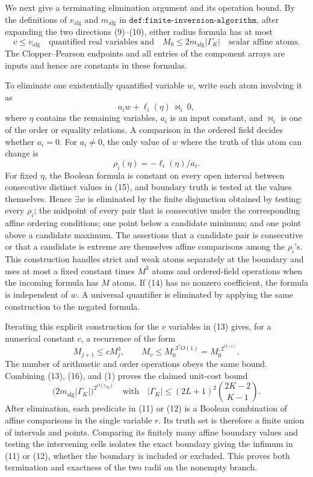 We next give a terminating elimination argument and its operation bound.  By the definitions of \(v_{\mathrm{alg}}\) and \(m_{\mathrm{alg}}\) in \(\texttt{def:finite-inversion-algorithm}\), after expanding the two directions (9)--(10), either radius formula has at most
\[
 v\leq v_{\mathrm{alg}}
 \quad\text{quantified real variables and}\quad
 M_0\leq 2m_{\mathrm{alg}}|\Gamma_K|
 \quad\text{scalar affine atoms}.
 \tag{13}
\]
The Clopper--Pearson endpoints and all entries of the component arrays are inputs and hence are constants in these formulas.

To eliminate one existentially quantified variable \(w\), write each atom involving it as
\[
 a_iw+\ell_i(\eta)\ \mathrel{\bowtie_i}\ 0,
 \tag{14}
\]
where \(\eta\) contains the remaining variables, \(a_i\) is an input constant, and \(\bowtie_i\) is one of the order or equality relations.  A comparison in the ordered field decides whether \(a_i=0\).  For \(a_i\neq0\), the only value of \(w\) where the truth of this atom can change is
\[
 \rho_i(\eta)=-\ell_i(\eta)/a_i.
 \tag{15}
\]
For fixed \(\eta\), the Boolean formula is constant on every open interval between consecutive distinct values in (15), and boundary truth is tested at the values themselves.  Hence \(\exists w\) is eliminated by the finite disjunction obtained by testing: every \(\rho_i\); the midpoint of every pair that is consecutive under the corresponding affine ordering conditions; one point below a candidate minimum; and one point above a candidate maximum.  The assertions that a candidate pair is consecutive or that a candidate is extreme are themselves affine comparisons among the \(\rho_i\)'s.  This construction handles strict and weak atoms separately at the boundary and uses at most a fixed constant times \(M^3\) atoms and ordered-field operations when the incoming formula has \(M\) atoms.  If (14) has no nonzero coefficient, the formula is independent of \(w\).  A universal quantifier is eliminated by applying the same construction to the negated formula.

Iterating this explicit construction for the \(v\) variables in (13) gives, for a numerical constant \(c\), a recurrence of the form
\[
 M_{j+1}\leq cM_j^3,
 \qquad
 M_v\leq M_0^{,3^{v}O(1)}=M_0^{,2^{O(v)}}.
 \tag{16}
\]
The number of arithmetic and order operations obeys the same bound.  Combining (13), (16), and (1) proves the claimed unit-cost bound
\[
 \bigl(2m_{\mathrm{alg}}|\Gamma_K|\bigr)^{2^{O(v_{\mathrm{alg}})}}
 \quad\text{with}\quad
 |\Gamma_K|\leq(2L+1)^2\binom{2K-2}{K-1}.
 \tag{17}
\]
After elimination, each predicate in (11) or (12) is a Boolean combination of affine comparisons in the single variable \(r\).  Its truth set is therefore a finite union of intervals and points.  Comparing its finitely many affine boundary values and testing the intervening cells isolates the exact boundary giving the infimum in (11) or (12), whether the boundary is included or excluded.  This proves both termination and exactness of the two radii on the nonempty branch.

